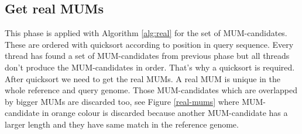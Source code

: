 \documentclass[3p,times]{elsarticle}
\begin{document}
\subsection*{Get real MUMs}
This phase is applied with Algorithm \ref{alg:real} for the set of MUM-candidates. These are ordered with quicksort according to position in query sequence. Every thread has found a set of MUM-candidates from previous phase but all threads don't produce the MUM-candidates in order. That's why a quicksort is required.\\
After quicksort we need to get the real MUMs. A real MUM is unique in the whole reference and query genome. Those MUM-candidates which are overlapped by bigger MUMs are discarded too, see Figure \ref{real-mums} where MUM-candidate in orange colour is discarded because another MUM-candidate has a larger length and they have same match in the reference genome.
\end{document}
